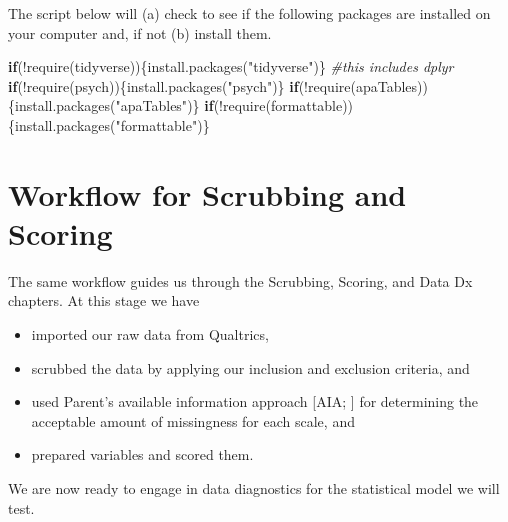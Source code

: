 \documentclass[
  english,
]{book}
\newenvironment{Shaded}{\begin{snugshade}}{\end{snugshade}}
\newcommand{\CommentTok}[1]{\textcolor[rgb]{0.56,0.35,0.01}{\textit{#1}}}
\newcommand{\ControlFlowTok}[1]{\textcolor[rgb]{0.13,0.29,0.53}{\textbf{#1}}}
\newcommand{\FunctionTok}[1]{\textcolor[rgb]{0.00,0.00,0.00}{#1}}
\newcommand{\NormalTok}[1]{#1}
\newcommand{\SpecialCharTok}[1]{\textcolor[rgb]{0.00,0.00,0.00}{#1}}
\newcommand{\StringTok}[1]{\textcolor[rgb]{0.31,0.60,0.02}{#1}}
\providecommand{\tightlist}{%
  \setlength{\itemsep}{0pt}\setlength{\parskip}{0pt}}
\begin{document}
The script below will (a) check to see if the following packages are installed on your computer and, if not (b) install them.

\begin{Shaded}
\begin{Highlighting}[]
\ControlFlowTok{if}\NormalTok{(}\SpecialCharTok{!}\FunctionTok{require}\NormalTok{(tidyverse))\{}\FunctionTok{install.packages}\NormalTok{(}\StringTok{"tidyverse"}\NormalTok{)\} }\CommentTok{\#this includes dplyr}
\ControlFlowTok{if}\NormalTok{(}\SpecialCharTok{!}\FunctionTok{require}\NormalTok{(psych))\{}\FunctionTok{install.packages}\NormalTok{(}\StringTok{"psych"}\NormalTok{)\}}
\ControlFlowTok{if}\NormalTok{(}\SpecialCharTok{!}\FunctionTok{require}\NormalTok{(apaTables))\{}\FunctionTok{install.packages}\NormalTok{(}\StringTok{"apaTables"}\NormalTok{)\}}
\ControlFlowTok{if}\NormalTok{(}\SpecialCharTok{!}\FunctionTok{require}\NormalTok{(formattable))\{}\FunctionTok{install.packages}\NormalTok{(}\StringTok{"formattable"}\NormalTok{)\}}
\end{Highlighting}
\end{Shaded}

\hypertarget{workflow-for-scrubbing-and-scoring-2}{%
\section{Workflow for Scrubbing and Scoring}\label{workflow-for-scrubbing-and-scoring-2}}

The same workflow guides us through the Scrubbing, Scoring, and Data Dx chapters. At this stage we have

\begin{itemize}
\tightlist
\item
  imported our raw data from Qualtrics,
\item
  scrubbed the data by applying our inclusion and exclusion criteria, and
\item
  used Parent's available information approach {[}AIA; \citeyearpar{parent_handling_2013}{]} for determining the acceptable amount of missingness for each scale, and
\item
  prepared variables and scored them.
\end{itemize}

We are now ready to engage in data diagnostics for the statistical model we will test.
\end{document}
